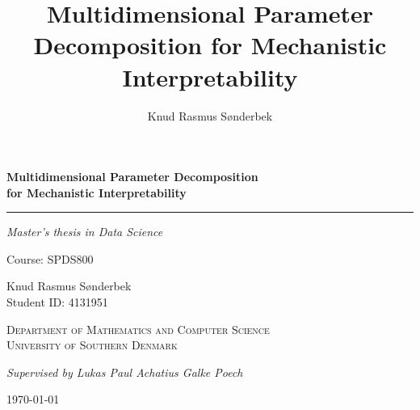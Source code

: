 \documentclass{article}
\begin{document}
\title{Multidimensional Parameter Decomposition for Mechanistic Interpretability}
\author{Knud Rasmus Sønderbek}

\begin{titlepage}
    \centering
 
    \vspace*{\fill}
     {\LARGE\bfseries
    \setlength{\baselineskip}{1.25\baselineskip}
    Multidimensional Parameter Decomposition\\
    for Mechanistic Interpretability\par}
 
    \vspace{1.4em}
    {\rule{0.4\linewidth}{0.4pt}}\par 
    \vspace{1.4em}
  
    {\itshape Master's thesis in Data Science\par}
    \vspace{0.4em}
    {\footnotesize Course: SPDS800\par}
    \vspace{2.2em}
 
    {\normalsize
    Knud Rasmus Sønderbek\\[0.35em]
    {\footnotesize Student ID: 4131951}\par}
     {\footnotesize\scshape
    Department of Mathematics and Computer Science\\[0.15em]
    University of Southern Denmark\par}
 
    \vspace{1.6em}
    {\footnotesize\itshape
    Supervised by Lukas Paul Achatius Galke Poech\par}
 
    \vspace*{\fill}
 
    {\footnotesize \today\par}
 
    \vspace*{1cm}
\end{titlepage}
\end{document}
